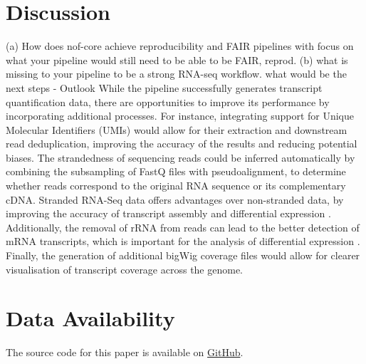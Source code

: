 \documentclass{article}
\theoremstyle{plain}
\theoremstyle{definition}
\theoremstyle{remark}
\begin{document}
\section{Discussion}
(a) How does nof-core achieve reproducibility and FAIR pipelines with focus on what your
pipeline would still need to be able to be FAIR, reprod.
(b) what is missing to your pipeline to be a strong RNA-seq workflow. what would be the next
steps - Outlook
While the pipeline successfully generates transcript quantification data, there are opportunities to improve its performance by incorporating additional processes. For instance, integrating support for Unique Molecular Identifiers (UMIs) would allow for their extraction and downstream read deduplication, improving the accuracy of the results and reducing potential biases. The strandedness of sequencing reads could be inferred automatically by combining the subsampling of FastQ files with pseudoalignment, to determine whether reads correspond to the original RNA sequence or its complementary cDNA. Stranded RNA-Seq data offers advantages over non-stranded data, by improving the accuracy of transcript assembly and differential expression \cite{Signal2022}. Additionally, the removal of rRNA from reads can lead to the better detection of mRNA transcripts, which is important for the analysis of differential expression \cite{Pastor2022}. Finally, the generation of additional bigWig coverage files would allow for clearer visualisation of transcript coverage across the genome.

\section*{Data Availability}
The source code for this paper is available on \href{{https://github.com/JuliaGraf/RNAseq}}{GitHub}.



\end{document}
